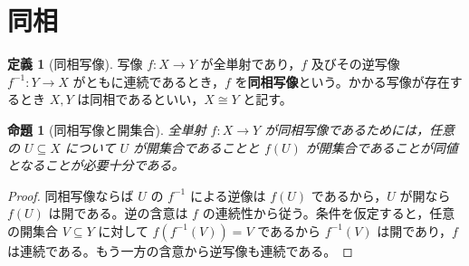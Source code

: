 \documentclass[a5paper,10pt,dvipdfmx]{jsarticle}
\theoremstyle{definition}
\newtheorem{defn}[ruledef]{定義}
\theoremstyle{plain}
\newtheorem{prop}[ruledef]{命題}
\begin{document}
\section{同相}
\begin{defn}[同相写像]\label{k223}
写像 $f:X\to Y$ が全単射であり，$f$ 及びその逆写像 $f^{-1}:Y\to X$ がともに連続であるとき，$f$ を\textbf{同相写像}という。かかる写像が存在するとき $X,Y$ は同相であるといい，$X\cong Y$ と記す。
\end{defn}
\begin{prop}[同相写像と開集合]\label{k224}
全単射 $f:X\to Y$ が同相写像であるためには，任意の $U\subseteq X$ について $U$ が開集合であることと $f(U)$ が開集合であることが同値となることが必要十分である。
\end{prop}
\begin{proof}
同相写像ならば $U$ の $f^{-1}$ による逆像は $f(U)$ であるから，$U$ が開なら $f(U)$ は開である。逆の含意は $f$ の連続性から従う。条件を仮定すると，任意の開集合 $V\subseteq Y$ に対して $f(f^{-1}(V))=V$ であるから $f^{-1}(V)$ は開であり，$f$ は連続である。もう一方の含意から逆写像も連続である。
\end{proof}
\par\medskip{}
\end{document}
